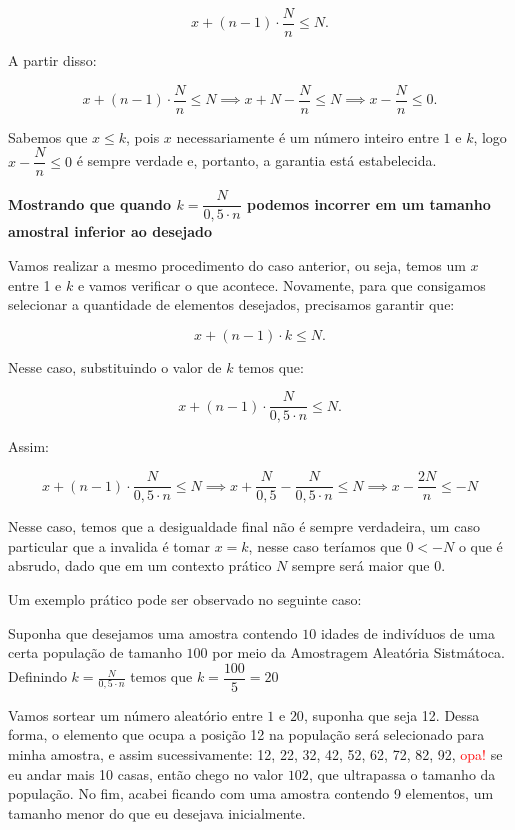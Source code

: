 \documentclass[12pt]{article}
\begin{document}
 $$x + (n-1) \cdot \dfrac{N}{n} \leq N.$$

 A partir disso:

  $$x + (n-1) \cdot \dfrac{N}{n} \leq N \implies x + N -\dfrac{N}{n} \leq N \implies x -\dfrac{N}{n} \leq 0 .$$

Sabemos que $x \leq k$, pois $x$ necessariamente é um número inteiro entre $1$ e $k$, logo $x -\dfrac{N}{n} \leq 0$ é sempre verdade e, portanto, a garantia está estabelecida. 


 \textbf{Mostrando que  quando  $k = \dfrac{N}{0,5 \cdot n}$ podemos incorrer em um tamanho amostral inferior ao desejado}

 Vamos realizar a mesmo procedimento do caso anterior, ou seja, temos um $x$ entre 1 e $k$ e vamos verificar o que acontece. Novamente, para que consigamos 
 selecionar a quantidade de elementos desejados, precisamos garantir que:

  $$x + (n-1) \cdot k \leq N.$$

Nesse caso, substituindo o valor de $k$ temos que:

  $$ x + (n-1) \cdot \dfrac{N}{0,5 \cdot n} \leq N.$$

Assim:

  $$ x + (n-1) \cdot \dfrac{N}{0,5 \cdot n} \leq N \implies  x + \dfrac{N}{0,5} - \dfrac{N}{0,5 \cdot n} \leq N \implies x - \dfrac{2N}{n} \leq -N$$

Nesse caso, temos que a desigualdade final não é sempre verdadeira, um caso particular que a invalida é tomar $x=k$, nesse caso teríamos que $0<-N$ o que é 
absrudo, dado que em um contexto prático $N$ sempre será maior que 0. 

Um exemplo prático pode ser observado no seguinte caso:

Suponha que desejamos uma amostra contendo $10$ idades de indivíduos de uma certa população de tamanho $100$ por meio da Amostragem Aleatória Sistmátoca.
 Definindo $k=\frac{N}{0,5 \cdot n}$ temos que $k=\dfrac{100}{5} = 20$

Vamos sortear um número aleatório entre $1$ e $20$, suponha que seja 12. Dessa forma, o elemento que ocupa a posição 12 na população será selecionado para minha amostra,
 e assim sucessivamente: 12, 22, 32, 42, 52, 62, 72, 82, 92, \textcolor{red}{opa!} se eu andar mais 10 casas, então chego no valor $102$, que ultrapassa o tamanho da população. 
 No fim, acabei ficando com uma amostra contendo 9 elementos, um tamanho menor do que eu desejava inicialmente. 


\vspace{3px}
\end{document}
